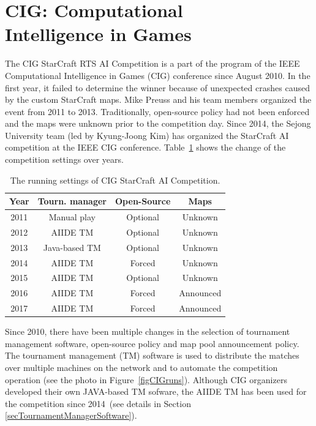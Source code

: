 \section{CIG: Computational\\ Intelligence in Games}\label{subsecCIG}

The CIG StarCraft RTS AI Competition is a part of the program of the IEEE Computational Intelligence in Games (CIG) conference since August 2010. In the first year, it failed to determine the winner because of unexpected crashes caused by the custom StarCraft maps. Mike Preuss and his team members organized the event from 2011 to 2013. Traditionally, open-source policy had not been enforced and the maps were unknown prior to the competition day. Since 2014, the Sejong University team (led by Kyung-Joong Kim) has organized the StarCraft AI competition at the IEEE CIG conference. Table~\ref{tableCIG} shows the change of the competition settings over years.  


\begin{table}[h] 
 
 \begin{center}
 \begin{tabular} {| c c c c |}
 \hline
 Year & Tourn. manager & Open-Source & Maps \\
 \hline
 2011 & Manual play & Optional & Unknown \\
 \hline
 2012 & AIIDE TM & Optional & Unknown \\
 \hline
 2013 & Java-based TM & Optional & Unknown \\
 \hline
 2014 & AIIDE TM & Forced & Unknown \\
 \hline
 2015 & AIIDE TM & Optional & Unknown \\
 \hline
 2016 & AIIDE TM & Forced & Announced \\ 
 \hline
 2017 & AIIDE TM & Forced & Announced \\ 
 \hline   
 \end{tabular}
 \end{center}  
 \caption{The running settings of CIG StarCraft AI Competition.}
 \label{tableCIG}
\end{table} 

Since 2010, there have been multiple changes in the selection of tournament management software, open-source policy and map pool announcement policy. The tournament management (TM) software is used to distribute the matches over multiple machines on the network and to automate the competition operation (see the photo in Figure~\ref{figCIGruns}). Although CIG organizers developed their own JAVA-based TM sofware, the AIIDE TM has been used for the competition since 2014~(see details in Section \ref{secTournamentManagerSoftware}). 


